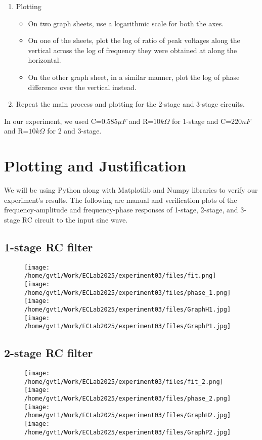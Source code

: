 \documentclass[a4paper,12pt]{article}
\begin{document}
\begin{enumerate}
  \item Plotting
    \begin{itemize}
      \item On two graph sheets, use a logarithmic scale for both the axes. 
      \item On one of the sheets, plot the log of ratio of peak voltages along the vertical across the log of frequency they were obtained at along the horizontal. 
      \item On the other graph sheet, in a similar manner, plot the log of phase difference over the vertical instead. 
    \end{itemize}
  \item Repeat the main process and plotting for the 2-stage and 3-stage circuits.
\end{enumerate}
In our experiment, we used C=$0.585\mu F$ and R=$10k\Omega$ for 1-stage and C=$220nF$ and R=$10k\Omega$ for 2 and 3-stage.
\section{Plotting and Justification}
We will be using Python along with Matplotlib and Numpy libraries to verify our experiment's results. The following are manual and verification plots of the frequency-amplitude and frequency-phase responses of 1-stage, 2-stage, and 3-stage RC circuit to the input sine wave. 
\subsection{1-stage RC filter}
\begin{figure}[H]
\centering
  \texttt{[image: /home/gvt1/Work/ECLab2025/experiment03/files/fit.png]}
  \texttt{[image: /home/gvt1/Work/ECLab2025/experiment03/files/phase\_1.png]}
  \texttt{[image: /home/gvt1/Work/ECLab2025/experiment03/files/GraphH1.jpg]}
  \texttt{[image: /home/gvt1/Work/ECLab2025/experiment03/files/GraphP1.jpg]}
\end{figure}
\subsection{2-stage RC filter}
\begin{figure}[H]
\centering
  \texttt{[image: /home/gvt1/Work/ECLab2025/experiment03/files/fit\_2.png]}
  \texttt{[image: /home/gvt1/Work/ECLab2025/experiment03/files/phase\_2.png]}
  \texttt{[image: /home/gvt1/Work/ECLab2025/experiment03/files/GraphH2.jpg]}
  \texttt{[image: /home/gvt1/Work/ECLab2025/experiment03/files/GraphP2.jpg]}
\end{figure}
\end{document}
